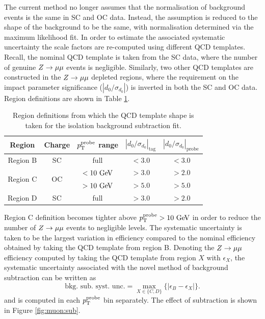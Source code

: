 The current method no longer assumes that the normalisation of background
events is the same in SC and OC data. Instead, the assumption is reduced
to the shape of the background to be the same, with normalisation 
determined via the maximum likelihood fit. In order to estimate the associated systematic
uncertainty the scale factors are re-computed using different QCD templates.
Recall, the nominal QCD template is taken from the SC data, where the number of
genuine $Z \rightarrow \mu\mu$ events is negligible. Similarly, two other QCD templates are
constructed in the $Z \rightarrow \mu\mu$ depleted regions, where the requirement on the
impact parameter significance ($|d_0/\sigma_{d_0}|$) is inverted in both
the SC and OC data. Region definitions are shown in Table \ref{tab:muon:reg}.
\begin{table}[h]
\centering
\caption{Region definitions from which the QCD template shape is taken
for the isolation background subtraction fit.}
\label{tab:muon:reg}
\begin{tabular}{c c c c c}
\toprule
\midrule
Region   & Charge & $p_{\text{T}}^\text{probe}$ range & $|d_0/\sigma_{d_0}|_\text{tag}$ & $|d_0/\sigma_{d_0}|_\text{probe}$ \\
\midrule
Region B & SC & full & $< 3.0$ & $ < 3.0$ \\
\midrule
\multirow{2}{*}{Region C} &  \multirow{2}{*}{OC} & $ < 10~\text{Ge\kern -0.1em V}$ & $ > 3.0$ & $ > 2.0$ \\
                          &                      & $ > 10~\text{Ge\kern -0.1em V}$ & $ > 5.0$ & $ > 5.0$ \\
\midrule
Region D & SC & full & $ > 3.0$ & $ > 2.0$ \\
\midrule
\bottomrule
\end{tabular}
\end{table}
Region C definition becomes tighter above $p_{\text{T}}^\text{probe} > 10~\text{Ge\kern -0.1em V}$
in order to reduce the number of $Z \rightarrow \mu\mu$ events to negligible levels. The
systematic uncertainty is taken to be the largest variation in efficiency
compared to the nominal efficiency obtained by taking the QCD template
from region B. Denoting the $Z \rightarrow \mu\mu$ efficiency computed by taking the
QCD template from region $X$ with $\epsilon_X$, the systematic
uncertainty associated with the novel method of background subtraction
can be written as
\begin{equation}
\text{bkg. sub. syst. unc.} = \max_{X \in \{C, D\}} \{ \vert \epsilon_B - \epsilon_X\vert \}.
\end{equation}
and is computed in each $p_{\text{T}}^\text{probe}$ bin separately. The effect
of subtraction is shown in Figure \ref{fig:muon:sub}.
